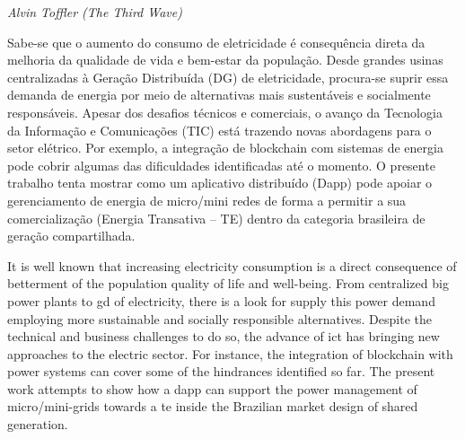 \hfill\textit{Alvin Toffler (The Third Wave)}


Sabe-se que o aumento do consumo de eletricidade é consequência direta da melhoria da qualidade de vida e bem-estar da população.
Desde grandes usinas centralizadas à Geração Distribuída (DG) de eletricidade, procura-se suprir essa demanda de energia por meio de alternativas mais sustentáveis e socialmente responsáveis.
Apesar dos desafios técnicos e comerciais, o avanço da Tecnologia da Informação e Comunicações (TIC) está trazendo novas abordagens para o setor elétrico.
Por exemplo, a integração de blockchain com sistemas de energia pode cobrir algumas das dificuldades identificadas até o momento.
O presente trabalho tenta mostrar como um aplicativo distribuído (Dapp) pode apoiar o gerenciamento de energia de micro/mini redes de forma a permitir a sua comercialização (Energia Transativa -- TE) dentro da categoria brasileira de geração compartilhada.

\imprimirchaves



It is well known that increasing electricity consumption is a direct consequence of betterment of the population quality of life and well-being.
From centralized big power plants to \acrfull{gd} of electricity, there is a look for supply this power demand employing more sustainable and socially responsible alternatives.
Despite the technical and business challenges to do so, the advance of \acrfull{ict} has bringing new approaches to the electric sector.
For instance, the integration of blockchain with power systems can cover some of the hindrances identified so far.
The present work attempts to show how a \acrfull{dapp} can support the power management of micro/mini-grids towards a \acrfull{te} inside the Brazilian market design of shared generation.

\printkeys

\listadefiguras
\listadetabelas


\printglossaries


\sumario
